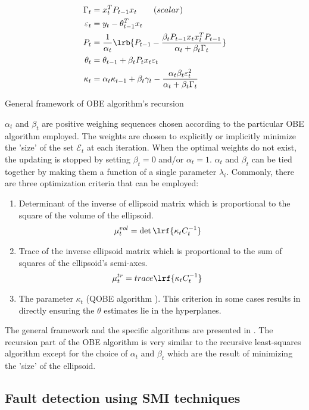 \begin{algorithm}
        \begin{align*}
                \Gamma_t &= x_t^T P_{t-1} x_t \qquad (scalar)\\
                \varepsilon_t &= y_t - \theta_{t-1}^T x_t\\
                P_t &= \frac{1}{\alpha_t} \lrb{P_{t-1} - \frac{\beta_t P_{t-1} x_t x_t^T P_{t-1}}{\alpha_t + \beta_t \Gamma_t}}\\
                \theta_t &= \theta_{t-1} + \beta_t P_t x_t \varepsilon_t\\
                \kappa_t &= \alpha_t \kappa_{t-1} + \beta_t \gamma_t - \frac{\alpha_t \beta_t \varepsilon_t^2}{\alpha_t + \beta_t \Gamma_t}
        \end{align*}
        \caption{General framework of OBE algorithm's recursion \cite{deller1994unifying}}
\end{algorithm}

$\alpha_t$ and $\beta_t$ are positive weighing sequences chosen according to the particular OBE algorithm employed. The weights are chosen to explicitly or implicitly minimize the 'size' of the set $\mathcal{E}_t$ at each iteration. When the optimal weights do not exist, the updating is stopped by setting $\beta_t  = 0$ and/or $\alpha_t = 1$.  $\alpha_t$ and $\beta_t$ can be tied together by making them a function of a single parameter $\lambda_i$. Commonly, there are three optimization criteria that can be employed:
\begin{enumerate}
        \item Determinant of the inverse of ellipsoid matrix which is proportional to the square of the volume of the ellipsoid.
        \begin{align}
                \mu_t^{vol} &= \det \lrf{\kappa_t C_t^{-1}}
        \end{align}

        \item Trace of the inverse ellipsoid matrix which is proportional to the sum of squares of the ellipsoid's semi-axes.
        \begin{align}
                \mu_t^{tr} &= trace \lrf{\kappa_t C_t^{-1}}
        \end{align}

        \item The parameter $\kappa_t$ (QOBE algorithm \cite{deller1993least}). This criterion in some cases results in directly ensuring the $\theta$ estimates lie in the hyperplanes.
\end{enumerate}
The general framework and the specific algorithms are presented in \cite{deller2002set}. The recursion part of the OBE algorithm is very similar to the recursive least-squares algorithm \cite{deller1989set} except for the choice of $\alpha_t$ and $\beta_t$ which are the result of minimizing the 'size' of the ellipsoid.


\subsection{Fault detection using SMI techniques}



